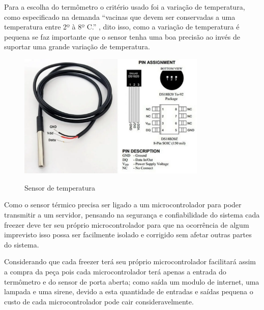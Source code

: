 \documentclass[hidelinks, 12pt, a4paper, brazil, oneside]{abntex2}
\begin{document}
    Para a escolha do termômetro o critério usado foi 
    a variação de temperatura, como especificado na demanda
    ``vacinas que devem ser conservadas a uma temperatura entre 2º à 8º C.''
    ,
    dito isso, como a variação de temperatura é pequena se faz 
    importante que o sensor tenha uma boa precisão ao 
    invés de suportar uma grande variação de temperatura.

    \begin{figure}[h]
        \caption{Sensor de temperatura}
        \centering
        \includegraphics[width=0.8\textwidth]{img/termometro_esquema.png}
        \label{fig:termometro}
    \end{figure}


    Como o sensor térmico precisa ser ligado a um microcontrolador
    para poder transmitir a um servidor, pensando na segurança e 
    confiabilidade do sistema cada freezer deve ter seu próprio 
    microcontrolador para que na ocorrência de algum imprevisto
    isso possa ser facilmente isolado e corrigido sem afetar 
    outras partes do sistema.

    Considerando que cada freezer terá seu próprio microcontrolador
    facilitará assim a compra da peça pois cada microcontrolador 
    terá apenas a entrada do termômetro e do sensor de porta aberta;
    como saída um modulo de internet, uma lampada e uma sirene, 
    devido a esta quantidade de entradas e saídas pequena o custo
    de cada microcontrolador pode cair consideravelmente.
\end{document}
